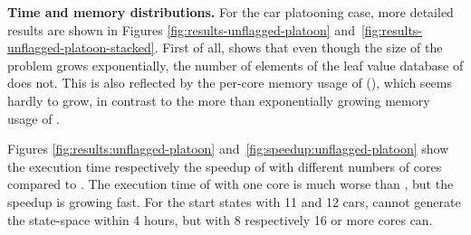 \medskip\noindent\textbf{Time and memory distributions.}\enspace
%
For the car platooning case, more detailed results are shown in Figures
\ref{fig:results-unflagged-platoon}
and~\ref{fig:results-unflagged-platoon-stacked}. First of all,
 shows that even though the size of the problem
grows exponentially, the number of elements of the leaf value database of
\LTSMIN does not. This is also reflected by the per-core memory usage of
\LTSMIN (), which seems hardly to grow, in contrast
to the more than exponentially growing memory usage of \GROOVE.

Figures \ref{fig:results:unflagged-platoon}
and~\ref{fig:speedup:unflagged-platoon} show the execution time respectively
the speedup of \LTSMIN with different numbers of cores compared to \GROOVE. The
execution time of \LTSMIN with one core is much worse than \GROOVE, but the
speedup is growing fast. For the start states with 11 and 12 cars, \GROOVE
cannot generate the state-space within 4 hours, but \LTSMIN with 8 respectively
16 or more cores can.

